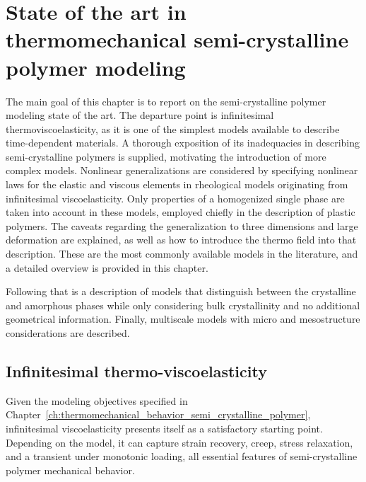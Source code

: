 \chapter{State of the art in thermomechanical semi-crystalline polymer modeling} \label{ch:modeling_semi_crystalline_polymer}

The main goal of this chapter is to report on the semi-crystalline polymer modeling state of the art.
The departure point is infinitesimal thermoviscoelasticity, as it is one of the simplest models available to describe time-dependent materials.
A thorough exposition of its inadequacies in describing semi-crystalline polymers is supplied, motivating the introduction of more complex models.
Nonlinear generalizations are considered by specifying nonlinear laws for the elastic and viscous elements in rheological models originating from infinitesimal viscoelasticity.
Only properties of a homogenized single phase are taken into account in these models, employed chiefly in the description of plastic polymers.
The caveats regarding the generalization to three dimensions and large deformation are explained, as well as how to introduce the thermo field into that description.
These are the most commonly available models in the literature, and a detailed overview is provided in this chapter.

Following that is a description of models that distinguish between the crystalline and amorphous phases while only considering bulk crystallinity and no additional geometrical information.
Finally, multiscale models with micro and mesostructure considerations are described.

\section{Infinitesimal thermo-viscoelasticity}
\label{sec:infinitesimal_thermo_viscoelasticity}
Given the modeling objectives specified in Chapter~\ref{ch:thermomechanical_behavior_semi_crystalline_polymer}, infinitesimal viscoelasticity presents itself as a satisfactory starting point.
Depending on the model, it can capture strain recovery, creep, stress relaxation, and a transient under monotonic loading, all essential features of semi-crystalline polymer mechanical behavior.

